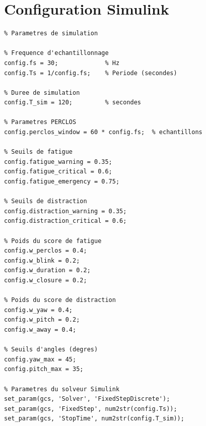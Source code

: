 \section{Configuration Simulink}

\begin{lstlisting}[style=matlabstyle, caption={Paramètres de configuration pour la simulation Simulink.}]
%% DMS Simulink Configuration
% Parametres de simulation

% Frequence d'echantillonnage
config.fs = 30;             % Hz
config.Ts = 1/config.fs;    % Periode (secondes)

% Duree de simulation
config.T_sim = 120;         % secondes

% Parametres PERCLOS
config.perclos_window = 60 * config.fs;  % echantillons

% Seuils de fatigue
config.fatigue_warning = 0.35;
config.fatigue_critical = 0.6;
config.fatigue_emergency = 0.75;

% Seuils de distraction
config.distraction_warning = 0.35;
config.distraction_critical = 0.6;

% Poids du score de fatigue
config.w_perclos = 0.4;
config.w_blink = 0.2;
config.w_duration = 0.2;
config.w_closure = 0.2;

% Poids du score de distraction
config.w_yaw = 0.4;
config.w_pitch = 0.2;
config.w_away = 0.4;

% Seuils d'angles (degres)
config.yaw_max = 45;
config.pitch_max = 35;

% Parametres du solveur Simulink
set_param(gcs, 'Solver', 'FixedStepDiscrete');
set_param(gcs, 'FixedStep', num2str(config.Ts));
set_param(gcs, 'StopTime', num2str(config.T_sim));
\end{lstlisting}
